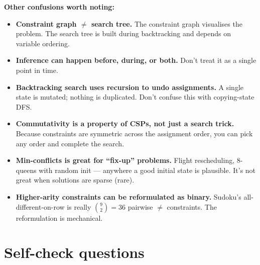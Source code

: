 \documentclass[11pt, a4paper]{article}
\begin{document}
\textbf{Other confusions worth noting:}

\begin{itemize}
  \item \textbf{Constraint graph $\ne$ search tree.} The constraint graph visualises the problem. The search tree is built during backtracking and depends on variable ordering.
  \item \textbf{Inference can happen before, during, or both.} Don't treat it as a single point in time.
  \item \textbf{Backtracking search uses recursion to undo assignments.} A single state is mutated; nothing is duplicated. Don't confuse this with copying-state DFS.
  \item \textbf{Commutativity is a property of CSPs, not just a search trick.} Because constraints are symmetric across the assignment order, you can pick any order and complete the search.
  \item \textbf{Min-conflicts is great for ``fix-up'' problems.} Flight rescheduling, 8-queens with random init — anywhere a good initial state is plausible. It's not great when solutions are sparse (rare).
  \item \textbf{Higher-arity constraints can be reformulated as binary.} Sudoku's all-different-on-row is really $\binom{9}{2} = 36$ pairwise $\neq$ constraints. The reformulation is mechanical.
\end{itemize}

\section*{Self-check questions}
\end{document}
